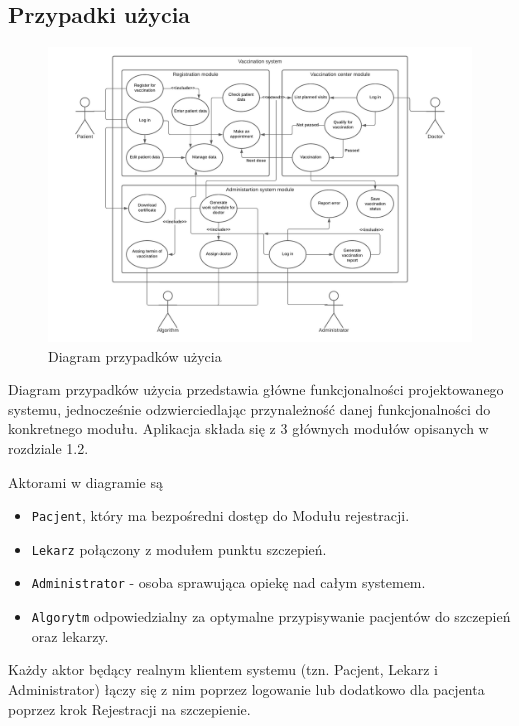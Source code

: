 \documentclass[a4paper,12pt,polish]{article}
\begin{document}
\subsection{Przypadki użycia}
\begin{figure}[h]
    \includegraphics[width=\textwidth]{IO1 - diagram - ENG.pdf} 
    \caption{Diagram przypadków użycia \label{fig:diagram-uml}}
\end{figure}

Diagram przypadków użycia przedstawia główne funkcjonalności projektowanego systemu, jednocześnie odzwierciedlając przynależność danej funkcjonalności do konkretnego modułu. Aplikacja składa się z 3 głównych modułów opisanych w rozdziale 1.2. 

Aktorami w diagramie są
\begin{itemize}
    \item \texttt{Pacjent}, który ma bezpośredni dostęp do Modułu rejestracji.
    \item \texttt{Lekarz} połączony z modułem punktu szczepień.
    \item \texttt{Administrator} - osoba sprawująca opiekę nad całym systemem.
    \item \texttt{Algorytm} odpowiedzialny za optymalne przypisywanie pacjentów do szczepień oraz lekarzy.
\end{itemize}

Każdy aktor będący realnym klientem systemu (tzn. Pacjent, Lekarz i Administrator) łączy się z nim poprzez logowanie lub dodatkowo dla pacjenta poprzez krok Rejestracji na szczepienie.\\
\end{document}

